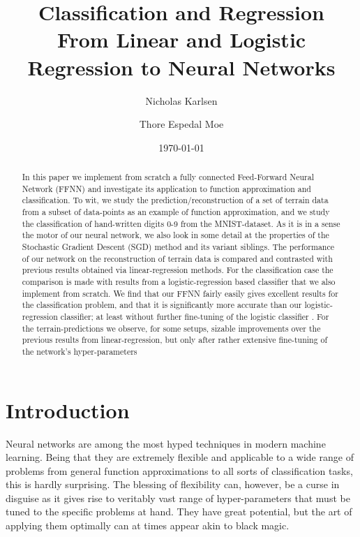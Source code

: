 \documentclass[reprint, english, nofootinbib]{revtex4-2}
\begin{document}
\title{Classification and Regression\\
\normalsize{From Linear and Logistic Regression to Neural Networks}}

\author{Nicholas Karlsen}
\author{Thore Espedal Moe}
\date{\today}

\begin{abstract}
In this paper we implement from scratch a fully connected Feed-Forward Neural Network (FFNN) and investigate its application to function approximation and classification. To wit, we study the prediction/reconstruction of a set of terrain data from a subset of data-points as an example of function approximation, and we study the classification of hand-written digits 0-9 from the MNIST-dataset. As it is in a sense the motor of our neural network, we also look in some detail at the properties of the Stochastic Gradient Descent (SGD) method and its variant siblings. The performance of our network on the reconstruction of terrain data is compared and contrasted with previous results obtained via linear-regression methods. For the classification case the comparison is made with results from a logistic-regression based classifier that we also implement from scratch. We find that our FFNN fairly easily gives excellent results for the classification problem, and that it is significantly more accurate than our logistic-regression classifier; at least without further fine-tuning of the logistic classifier . For the terrain-predictions we observe, for some setups, sizable improvements over the previous results from linear-regression, but only after rather extensive fine-tuning of the network's hyper-parameters

\end{abstract}

\maketitle

\section{Introduction}


Neural networks are among the most hyped techniques in modern machine learning. Being that they are extremely flexible and applicable to a wide range of problems from general function approximations to all sorts of classification tasks, this is hardly surprising. The blessing of flexibility can, however, be a curse in disguise as it gives rise to veritably vast range of hyper-parameters that must be tuned to the specific problems at hand. They have great potential, but the art of applying them optimally can at times appear akin to black magic.
\end{document}
